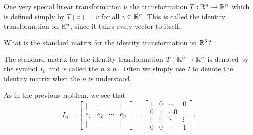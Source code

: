 \endedxproblem



One very special linear transformation is the transformation $T: \mathbb R^n \rightarrow \mathbb R^n$ which is defined
simply by $T(v) = v$ for all $v\in \mathbb R^n$.  This is called the identity transformation on $\mathbb R^n$, since it takes
every vector to itself.  

What is the standard matrix for the identity transformation on $\mathbb R^3$?
 






\endedxproblem

\endedxvertical










{} The standard matrix for the identity transformation $T: \mathbb R^n \rightarrow \mathbb R^n$
is denoted by the symbol $I_n$ and is called the $n\times n$ {}.  Often we simply
use $I$ to denote the identity matrix when the $n$ is understood.  

As in the previous problem, we see that 
\[ I_n = \left[ \begin{array}{cccc} | & | & & | \\ 
e_1 & e_2 & \cdots & e_n \\
 | & | & & | \end{array} \right] = \left[\begin{array}{cccc} 1 & 0 &\cdots & 0 \\ 0 & 1 & \cdots 0 \\ \vdots & \vdots & \ddots & \vdots
\\ 0 & 0 & \cdots & 1  \end{array} \right]. \] 

